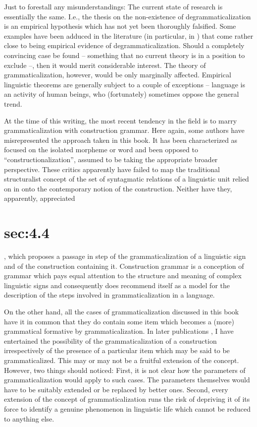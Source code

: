 Just to forestall any misunderstandings: The current state of research is essentially the same. I.e., the thesis on the non-existence of degrammaticalization is an empirical hypothesis which has not yet been thoroughly falsified. Some examples have been adduced in the literature (in particular, in \citealt{Norde2009}) that come rather close to being empirical evidence of degrammaticalization. Should a completely convincing case be found – something that no current theory is in a position to exclude –, then it would merit considerable interest. The theory of grammaticalization, however, would be only marginally affected. Empirical linguistic theorems are generally subject to a couple of exceptions – language is an activity of human beings, who (fortunately) sometimes oppose the general trend.

At the time of this writing, the most recent tendency in the field is to marry grammaticalization with construction grammar. Here again, some authors have misrepresented the approach taken in this book. It has been characterized as focused on the isolated morpheme or word and been opposed to “constructionalization”, assumed to be taking the appropriate broader perspective. These critics apparently have failed to map the traditional structuralist concept of the set of syntagmatic relations of a linguistic unit relied on in  onto the contemporary notion of the construction. Neither have they, apparently, appreciated \chapter{sec:4.4}, which proposes a passage in step of the grammaticalization of a linguistic sign and of the construction containing it. Construction grammar is a conception of grammar which pays equal attention to the structure and meaning of complex linguistic signs and consequently does recommend itself as a model for the description of the steps involved in grammaticalization in a language.

On the other hand, all the cases of grammaticalization discussed in this book have it in common that they do contain some item which becomes a (more) grammatical formative by grammaticalization. In later publications \citep[§2.3]{Lehmann2002}, I have entertained the possibility of the grammaticalization of a construction irrespectively of the presence of a particular item which may be said to be grammaticalized. This may or may not be a fruitful extension of the concept. However, two things should noticed: First, it is not clear how the parameters of grammaticalization would apply to such cases. The parameters themselves would have to be suitably extended or be replaced by better ones. Second, every extension of the concept of grammaticalization runs the risk of depriving it of its force to identify a genuine phenomenon in linguistic life which cannot be reduced to anything else.

